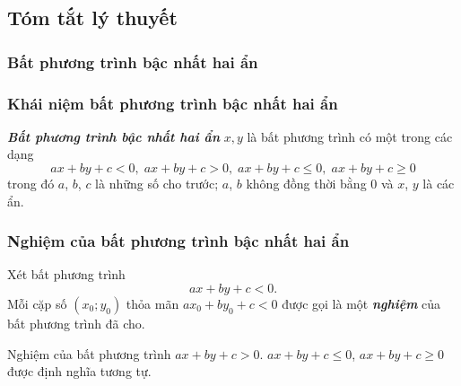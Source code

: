 \subsection{Tóm tắt lý thuyết}
\subsubsection{Bất phương trình bậc nhất hai ẩn}
\subsubsection{Khái niệm bất phương trình bậc nhất hai ẩn}
\begin{boxdn}
	\textbf{\textit{Bất phương trình bậc nhất hai ẩn}} $x, y$ là bất phương trình có một trong các dạng
	$$ax+by+c<0,\; ax+by+c>0 ,\; ax+by+c \leq 0 ,\; a x+b y+c \geq 0$$
	trong đó $a$, $b$, $c$ là những số cho trước; $a$, $b$ không đồng thời bằng $0$ và $x$, $y$ là các ẩn.
\end{boxdn}
\subsubsection{Nghiệm của bất phương trình bậc nhất hai ẩn}
\begin{boxdn}
	Xét bất phương trình $$ax+by+c<0.$$
	Mỗi cặp số $(x_0;y_0)$ thỏa mãn $ax_0+by_0+c<0$ được gọi là một \textbf{\textit{nghiệm}} của bất phương trình đã cho.
\end{boxdn}
\begin{note}
	Nghiệm của bất phương trình $ax+by+c>0$. $ax+by+c \leq 0$, $ax+by+c \geq 0$ được định nghĩa tương tự.
\end{note}
